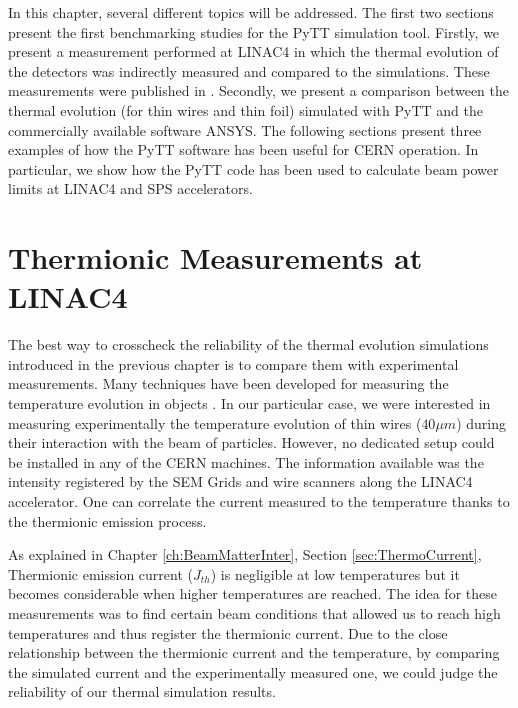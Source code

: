 \pagestyle{fancy}

\graphicspath{ {Figures/Chapter5_SimulationBenchmarking/} }

In this chapter, several different topics will be addressed. The first two sections present the first benchmarking studies for the PyTT simulation tool. Firstly, we present a measurement performed at LINAC4 in which the thermal evolution of the detectors was indirectly measured and compared to the simulations. These measurements were published in \parencite[][]{ref:IBIC2019ARaceli}. Secondly, we present a comparison between the thermal evolution (for thin wires and thin foil) simulated with PyTT and the commercially available software ANSYS. The following sections present three examples of how the PyTT software has been useful for CERN operation. In particular, we show how the PyTT code has been used to calculate beam power limits at LINAC4 and SPS accelerators. 

\section{Thermionic Measurements at LINAC4}
\label{sec:ThAtLINAC4}

The best way to crosscheck the reliability of the thermal evolution simulations introduced in the previous chapter is to compare them with experimental measurements. Many techniques have been developed for measuring the temperature evolution in objects \parencite[][]{ref:ThMeas1}. In our particular case, we were interested in measuring experimentally the temperature evolution of thin wires ($40 \mu m$) during their interaction with the beam of particles. However, no dedicated setup could be installed in any of the CERN machines. The information available was the intensity registered by the SEM Grids and wire scanners along the LINAC4 accelerator. One can correlate the current measured to the temperature thanks to the thermionic emission process. 

As explained in Chapter \ref{ch:BeamMatterInter}, Section \ref{sec:ThermoCurrent}, Thermionic emission current ($J_{th}$) is negligible at low temperatures but it becomes considerable when higher temperatures are reached. The idea for these measurements was to find certain beam conditions that allowed us to reach high temperatures and thus register the thermionic current. Due to the close relationship between the thermionic current and the temperature, by comparing the simulated current and the experimentally measured one, we could judge the reliability of our thermal simulation results. 

